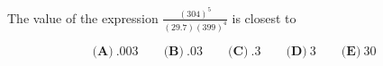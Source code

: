 

The value of the expression $ \frac{(304)^5}{(29.7)(399)^4}$ is closest to

\[ \textbf{(A)}\ .003 \qquad
\textbf{(B)}\ .03 \qquad
\textbf{(C)}\ .3 \qquad
\textbf{(D)}\ 3 \qquad
\textbf{(E)}\ 30
\]